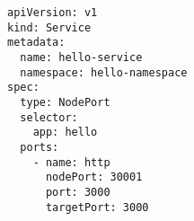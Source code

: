 \lstset{
numbers=left, 
basicstyle=\footnotesize,
frame = single, 
language=Pascal, 
framexleftmargin=16pt,
xleftmargin=2.3cm,
}
\begin{lstlisting}[linewidth=13cm, caption={The manifest of the \textit{hello} service.},label={lst:serviceManifest}]
apiVersion: v1
kind: Service
metadata:
  name: hello-service
  namespace: hello-namespace
spec:
  type: NodePort
  selector:
    app: hello
  ports:
    - name: http
      nodePort: 30001
      port: 3000
      targetPort: 3000
\end{lstlisting}